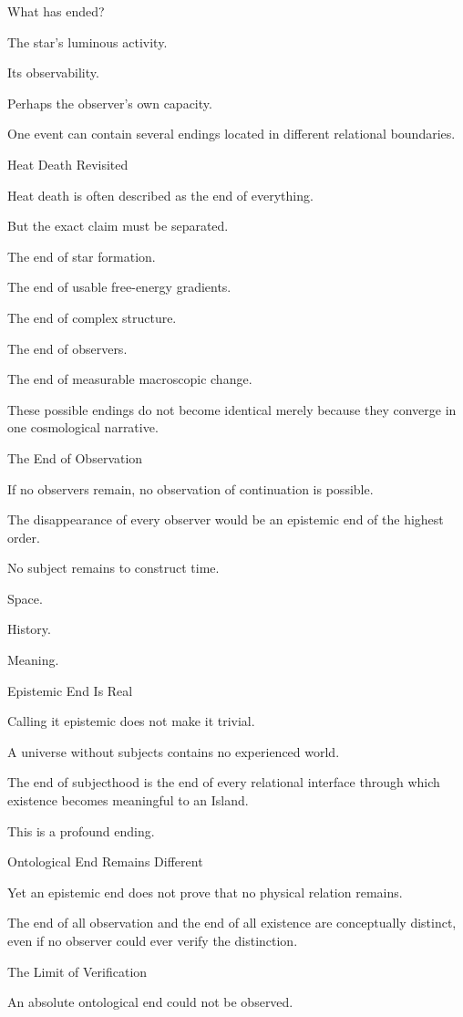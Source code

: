 What has ended?

The star’s luminous activity.

Its observability.

Perhaps the observer’s own capacity.

One event can contain several endings located in different relational boundaries.

Heat Death Revisited

Heat death is often described as the end of everything.

But the exact claim must be separated.

The end of star formation.

The end of usable free-energy gradients.

The end of complex structure.

The end of observers.

The end of measurable macroscopic change.

These possible endings do not become identical merely because they converge in one cosmological narrative.

The End of Observation

If no observers remain, no observation of continuation is possible.

The disappearance of every observer would be an epistemic end of the highest order.

No subject remains to construct time.

Space.

History.

Meaning.

Epistemic End Is Real

Calling it epistemic does not make it trivial.

A universe without subjects contains no experienced world.

The end of subjecthood is the end of every relational interface through which existence becomes meaningful to an Island.

This is a profound ending.

Ontological End Remains Different

Yet an epistemic end does not prove that no physical relation remains.

The end of all observation and the end of all existence are conceptually distinct, even if no observer could ever verify the distinction.

The Limit of Verification

An absolute ontological end could not be observed.

